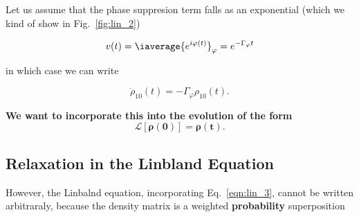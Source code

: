   
  \noindent Let us assume that the phase suppresion term falls as an exponential (which we kind of show in Fig.~\ref{fig:lin_2})
  
  \begin{equation}\label{key}
  	v(t) = \iaverage{e^{i\varphi(t)}}_\varphi = e^{-\Gamma_{\varphi}t}
  \end{equation}
  
  \noindent in which case we can write
  
  \begin{equation}\label{eqn:lin_3}
  	\dot{\rho}_{10}(t) = -\Gamma_{\varphi}\rho_{10}(t).
  \end{equation}
  
  \noindent \textbf{We want to incorporate this into the evolution of the form}
  \begin{equation}\label{key}
  	\mathbf{\mathcal{L}[\rho(0)] = \rho(t)}.
  \end{equation}
 \subsection{Relaxation in the Linbland Equation}
  However, the Linbalnd equation, incorporating Eq.~\eqref{eqn:lin_3}, cannot be written arbitraraly, because the density matrix is a weighted \textbf{probability} superposition
  
